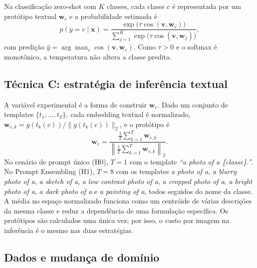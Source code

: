 \documentclass[conference]{IEEEtran}
\begin{document}
Na classificação zero-shot com $K$ classes, cada classe $c$ é representada por um protótipo textual $\mathbf{w}_c$ e a probabilidade estimada é
\begin{equation}
p(y = c \mid \mathbf{x}) = \frac{\exp\big(\tau \cos(\mathbf{v}, \mathbf{w}_c)\big)}{\sum_{j=1}^{K} \exp\big(\tau \cos(\mathbf{v}, \mathbf{w}_j)\big)},
\end{equation}
com predição $\hat{y} = \arg\max_c \cos(\mathbf{v}, \mathbf{w}_c)$. Como $\tau > 0$ e o softmax é monotônico, a temperatura não altera a classe predita.

\subsection{Técnica C: estratégia de inferência textual}

A variável experimental é a forma de construir $\mathbf{w}_c$. Dado um conjunto de templates $\{t_1, \dots, t_T\}$, cada embedding textual é normalizado, $\mathbf{w}_{c,k} = g(t_k(c)) / \lVert g(t_k(c)) \rVert_2$, e o protótipo é
\begin{equation}
\mathbf{w}_c = \frac{\frac{1}{T}\sum_{k=1}^{T} \mathbf{w}_{c,k}}{\left\lVert \frac{1}{T}\sum_{k=1}^{T} \mathbf{w}_{c,k} \right\rVert_2}.
\end{equation}
No cenário de prompt único (H0), $T = 1$ com o template \textit{``a photo of a \{classe\}.''}. No Prompt Ensembling (H1), $T = 8$ com os templates \textit{a photo of a}, \textit{a blurry photo of a}, \textit{a sketch of a}, \textit{a low contrast photo of a}, \textit{a cropped photo of a}, \textit{a bright photo of a}, \textit{a dark photo of a} e \textit{a painting of a}, todos seguidos do nome da classe. A média no espaço normalizado funciona como um centróide de várias descrições da mesma classe e reduz a dependência de uma formulação específica. Os protótipos são calculados uma única vez; por isso, o custo por imagem na inferência é o mesmo nas duas estratégias.

\subsection{Dados e mudança de domínio}
\end{document}
